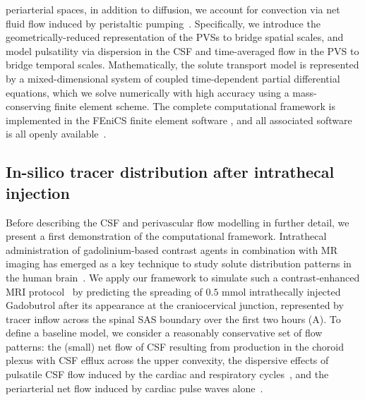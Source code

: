 \documentclass[fleqn,10pt]{wlscirep}
\begin{document}
periarterial spaces, in addition to diffusion, we account for
convection via net fluid flow induced by peristaltic
pumping~\cite{mestre2018flow, gjerde2023directional}. Specifically, we
introduce the geometrically-reduced representation of the PVSs to
bridge spatial scales, and model pulsatility via dispersion in the CSF
and time-averaged flow in the PVS to bridge temporal
scales. Mathematically, the solute transport model is represented by a
mixed-dimensional system of coupled time-dependent partial
differential equations\cite{masri2024modelling}, which we solve
numerically with high accuracy using a mass-conserving finite element
scheme. The complete computational framework is implemented in the
FEniCS finite element software \cite{alnaes2015fenics,
  kuchta2020assembly}, and all associated software is all openly
available~\cite{ZENODO}.

\subsection*{In-silico tracer distribution after intrathecal injection}

Before describing the CSF and perivascular flow modelling in further
detail, we present a first demonstration of the computational
framework. Intrathecal administration of gadolinium-based contrast
agents in combination with MR imaging has emerged as a key technique
to study solute distribution patterns in the human
brain~\cite{ringstad2017glymphatic, ringstad2018brain,
  eide2024functional, van2024human, kipnis2025resolving}. We apply our
framework to simulate such a contrast-enhanced MRI
protocol~\cite{ringstad2018brain} by predicting the spreading of $0.5$
mmol intrathecally injected Gadobutrol after its appearance at the
craniocervical junction, represented by tracer inflow across the
spinal SAS boundary over the first two hours
(A). To define a baseline model, we consider a
reasonably conservative set of flow patterns: the (small) net flow of
CSF resulting from production in the choroid plexus with CSF efflux across the upper convexity\cite{hornkjol2022csf}, the dispersive effects of pulsatile
CSF flow induced by the cardiac and respiratory
cycles~\cite{sweetman2011cerebrospinal, vinje2019respiratory}, and the
periarterial net flow induced by cardiac pulse waves
alone~\cite{mestre2018flow, gjerde2023directional}.
\end{document}
